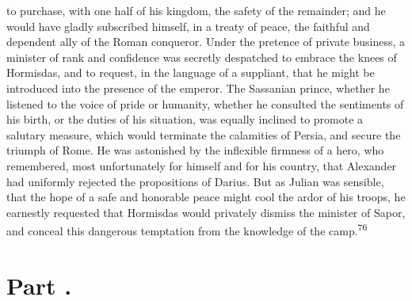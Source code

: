 to purchase, with one half of his kingdom, the safety of the
remainder; and he would have gladly subscribed himself, in a
treaty of peace, the faithful and dependent ally of the Roman
conqueror. Under the pretence of private business, a minister of
rank and confidence was secretly despatched to embrace the knees
of Hormisdas, and to request, in the language of a suppliant,
that he might be introduced into the presence of the emperor. The
Sassanian prince, whether he listened to the voice of pride or
humanity, whether he consulted the sentiments of his birth, or
the duties of his situation, was equally inclined to promote a
salutary measure, which would terminate the calamities of Persia,
and secure the triumph of Rome. He was astonished by the
inflexible firmness of a hero, who remembered, most unfortunately
for himself and for his country, that Alexander had uniformly
rejected the propositions of Darius. But as Julian was sensible,
that the hope of a safe and honorable peace might cool the ardor
of his troops, he earnestly requested that Hormisdas would
privately dismiss the minister of Sapor, and conceal this
dangerous temptation from the knowledge of the camp.\textsuperscript{76}





\section{Part \thesection.}

